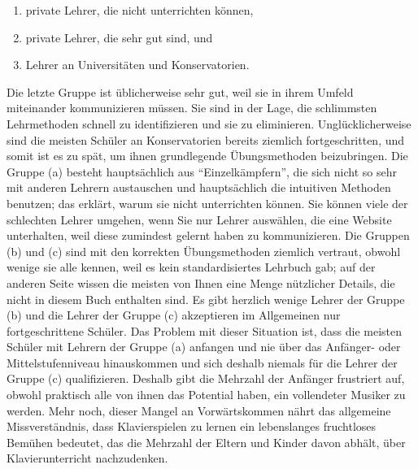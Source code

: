 \begin{enumerate}[label={\alph*.}] 
\item private Lehrer, die nicht unterrichten können,
\item private Lehrer, die sehr gut sind, und
\item Lehrer an Universitäten und Konservatorien.
 \end{enumerate}
Die letzte Gruppe ist üblicherweise sehr gut, weil sie in ihrem Umfeld miteinander kommunizieren müssen.
Sie sind in der Lage, die schlimmsten Lehrmethoden schnell zu identifizieren und sie zu eliminieren.
Unglücklicherweise sind die meisten Schüler an Konservatorien bereits ziemlich fortgeschritten, und somit ist es zu spät, um ihnen grundlegende Übungsmethoden beizubringen.
Die Gruppe (a) besteht hauptsächlich aus \enquote{Einzelkämpfern}, die sich nicht so sehr mit anderen Lehrern austauschen und hauptsächlich die intuitiven Methoden benutzen; das erklärt, warum sie nicht unterrichten können.
Sie können viele der schlechten Lehrer umgehen, wenn Sie nur Lehrer auswählen, die eine Website unterhalten, weil diese zumindest gelernt haben zu kommunizieren.
Die Gruppen (b) und (c) sind mit den korrekten Übungsmethoden ziemlich vertraut, obwohl wenige sie alle kennen, weil es kein standardisiertes Lehrbuch gab; auf der anderen Seite wissen die meisten von Ihnen eine Menge nützlicher Details, die nicht in diesem Buch enthalten sind.
Es gibt herzlich wenige Lehrer der Gruppe (b) und die Lehrer der Gruppe (c) akzeptieren im Allgemeinen nur fortgeschrittene Schüler.
Das Problem mit dieser Situation ist, dass die meisten Schüler mit Lehrern der Gruppe (a) anfangen und nie über das Anfänger- oder Mittelstufenniveau hinauskommen und sich deshalb niemals für die Lehrer der Gruppe (c) qualifizieren.
Deshalb gibt die Mehrzahl der Anfänger frustriert auf, obwohl praktisch alle von ihnen das Potential haben, ein vollendeter Musiker zu werden.
Mehr noch, dieser Mangel an Vorwärtskommen nährt das allgemeine Missverständnis, dass Klavierspielen zu lernen ein lebenslanges fruchtloses Bemühen bedeutet, das die Mehrzahl der Eltern und Kinder davon abhält, über Klavierunterricht nachzudenken.

